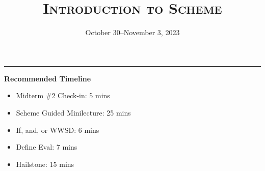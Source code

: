 \documentclass{exam}
\title{\textsc{Introduction to Scheme}}
\date{October 30--November 3, 2023}
\begin{document}
\maketitle
\rule{\textwidth}{0.15em}

\begin{meta}
\begin{blocksection}
    \textbf{Recommended Timeline}
    \begin{itemize}
        \item Midterm \#2 Check-in: 5 mins
        \item Scheme Guided Minilecture: 25 mins
        \item If, and, or WWSD: 6 mins
        \item Define Eval: 7 mins
        \item Hailstone: 15 mins
    \end{itemize}
\end{blocksection}
\end{meta}
\end{document}
